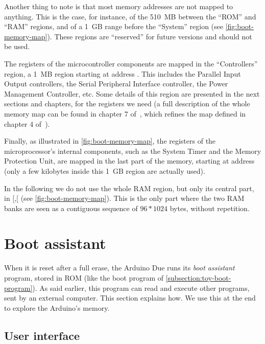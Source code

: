 Another thing to note is that most memory addresses are not mapped to anything.
This is the case, for instance, of the 510~MB between the ``ROM'' and ``RAM''
regions, and of a 1~GB range before the ``System'' region (see
\cref{fig:boot-memory-map}). These regions are ``reserved'' for future versions
and should not be used.

The registers of the microcontroller components are mapped in the
``Controllers'' region, a 1~MB region starting at address . This
includes the Parallel Input Output controllers, the Serial Peripheral Interface
controller, the Power Management Controller, etc. Some details of this region
are presented in the next sections and chapters, for the registers we need (a
full description of the whole memory map can be found in chapter 7
of~\cite{SAM3X8E}, which refines the map defined in chapter 4
of~\cite{CortexM3RerefenceManual}).

Finally, as illustrated in \cref{fig:boot-memory-map}, the registers of the
microprocessor's internal components, such as the System Timer and the Memory
Protection Unit, are mapped in the last part of the memory, starting at address
 (only a few kilobytes inside this 1~GB region are actually
used).

In the following we do not use the whole RAM region, but only its central part,
in [,[ (see \cref{fig:boot-memory-map}). This is
the only part where the two RAM banks are seen as a contiguous sequence of
$96*1024$ bytes, without repetition.

\section{Boot assistant}\label{section:boot-assistant}

When it is reset after a full erase, the Arduino Due runs its {\em boot
assistant} program, stored in ROM (like the boot program of
\cref{subsection:toy-boot-program}). As said earlier, this program can read and
execute other programs, sent by an external computer. This section explains
how. We use this at the end to explore the Arduino's memory.

\subsection{User interface}

